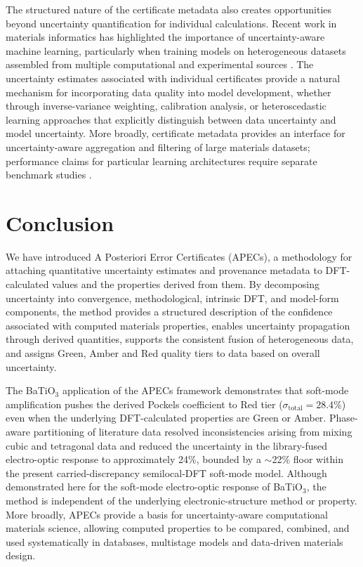 \documentclass[twocolumn,superscriptaddress,amsmath,amssymb,longbibliography]{revtex4-2}
\begin{document}
The structured nature of the certificate metadata also creates opportunities beyond uncertainty quantification for individual calculations. Recent work in materials informatics has highlighted the importance of uncertainty-aware machine learning, particularly when training models on heterogeneous datasets assembled from multiple computational and experimental sources \cite{Kendall2017,Nix1994,Guo2017_calibration,Kuleshov2018,Tran2018_active}. The uncertainty estimates associated with individual certificates provide a natural mechanism for incorporating data quality into model development, whether through inverse-variance weighting, calibration analysis, or heteroscedastic learning approaches that explicitly distinguish between data uncertainty and model uncertainty. More broadly, certificate metadata provides an interface for uncertainty-aware aggregation and filtering of large materials datasets; performance claims for particular learning architectures require separate benchmark studies \cite{Schutt2018_SchNet,Chen2022_M3GNet,Batatia2022_MACE}.

\section{Conclusion}
\label{sec:conclusion}

We have introduced A Posteriori Error Certificates (APECs), a methodology for attaching quantitative uncertainty estimates and provenance metadata to DFT-calculated values and the properties derived from them.  By decomposing  uncertainty into convergence, methodological, intrinsic DFT,
and model-form components, the method provides a structured description of the confidence associated with computed materials properties, enables uncertainty propagation through derived quantities, supports the consistent fusion of heterogeneous data, and assigns Green, Amber and Red quality tiers to data based on overall uncertainty.

The BaTiO$_3$ application of the APECs framework   demonstrates that
soft-mode amplification pushes the derived Pockels coefficient to Red
tier ($\sigma_{\mathrm{total}} = 28.4\%$) even when the underlying DFT-calculated
properties are Green or Amber. Phase-aware partitioning of literature
data resolved inconsistencies arising from mixing cubic and tetragonal data and reduced the uncertainty in the library-fused electro-optic response to approximately 24\%, bounded by a $\sim$22\% floor within the present carried-discrepancy semilocal-DFT soft-mode model. Although demonstrated here for the soft-mode electro-optic response of BaTiO$_3$, the method is independent of the underlying electronic-structure method or property. More broadly, APECs provide a  basis for uncertainty-aware computational materials science, allowing computed properties to be compared, combined, and used systematically in databases, multistage models and data-driven materials design.
\end{document}
